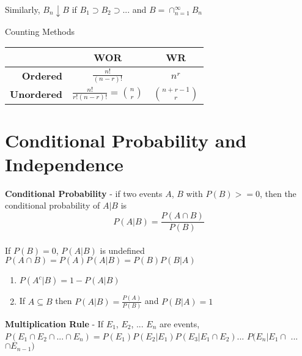 \documentclass[14pt, oneside, letterpaper]{notes}
\begin{document}
\begin{mydef}
	Similarly, $B_n \downarrow B$ if $B_1 \supset B_2 \supset ... $ and
	$B = \cap_{n=1}^{\infty} B_n$ 
\end{mydef}


%
%
\begin{mydef}
Counting Methods
\begin{table}[h!]
	\begin{tabular}{r|c|c}
		& \textbf{WOR} & \textbf{WR} \\
		\hline
		
		\textbf{Ordered} 
		& $\displaystyle \frac{n!}{(n-r)!} $ 
		& $\displaystyle n^r $ \\
		
		\textbf{Unordered} 
		& $\displaystyle \frac{n!}{r!(n-r)!} 
		= {n \choose r} $ 
		& $\displaystyle {n+r-1 \choose r} $ \\
	\end{tabular}
\end{table}

\end{mydef}

%
%
\section*{Conditional Probability and Independence}

\begin{mydef}
	\textbf{Conditional Probability} - if two events 
	$A$, $B$ with $P(B) >= 0$, then the conditional 
	probability of $A|B$ is \[P(A|B) = \frac{P(A\cap B)}
	{P(B)}\] \\
	If $P(B) = 0$, $P(A|B)$ is undefined \\
	$P(A \cap B) = P(A)P(A|B) = P(B)P(B|A)$ \\
\end{mydef}

\begin{enumerate}
\item $P(A^c|B) = 1 - P(A|B)$
\item If $A \subseteq B$ then $P(A|B) = \frac{P(A)}{P(B)}$
	and $P(B|A) = 1$
\end{enumerate}

\begin{mydef}
	\textbf{Multiplication Rule} - 
	If $E_1$, $E_2$, ... $E_n$ are events, \\ 
	$P(E_1 \cap E_2 \cap ... \cap E_n) = 
	P(E_1)P(E_2|E_1)P(E_3|E_1\cap E_2)$...
	$P(E_n|E_1 \cap$ ...$ \cap E_{n-1})$
\end{mydef}
\end{document}
